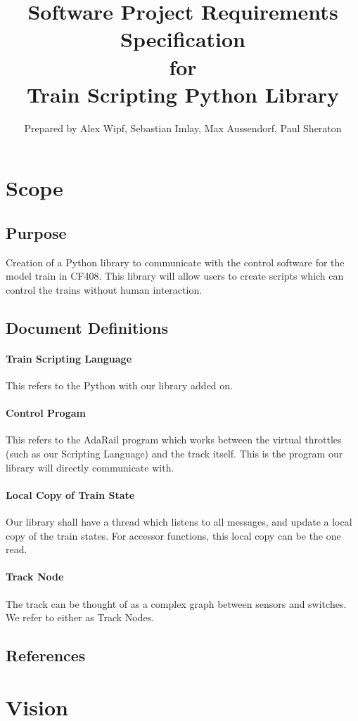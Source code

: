 \documentclass[a4paper,11pt,notitlepage]{article}
\title{{\bf Software Project Requirements Specification} \\ for \\ {\bf Train Scripting Python Library}}
\author{Prepared by Alex Wipf, Sebastian Imlay, Max Aussendorf, Paul Sheraton}
\def\TSL{Train Scripting Language\xspace}
\def\CS{Control Progam\xspace}
\def\LC{Local Copy of Train State\xspace}
\def\TN{Track Node\xspace}
\begin{document}
\maketitle
\pagebreak
\tableofcontents

\newpage
\section{Scope}
\subsection{Purpose}
Creation of a Python library to communicate with the control software for the model train in CF408. This library will allow users to create scripts which can control the trains without human interaction.
\subsection{Document Definitions}
\paragraph{\TSL} This refers to the Python with our library added on.
\paragraph{\CS} This refers to the AdaRail program which works between the virtual throttles (such as our Scripting Language) and the track itself. This is the program our library will directly communicate with.
\paragraph{\LC} Our library shall have a thread which listens to all messages, and update a local copy of the train states. For accessor functions, this local copy can be the one read.
\paragraph{\TN} The track can be thought of as a complex graph between sensors and switches. We refer to either as \TN{}s.
\subsection{References}

\newpage
\section{Vision}
\end{document}
